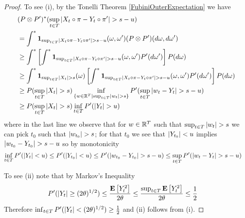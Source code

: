 \begin{proof}
To see (i), by the Tonelli Theorem \ref{FubiniOuterExpectation} we have
\begin{align*}
&(P \otimes P^\prime)^* (\sup_{t \in T} \left \vert X_t \circ \pi  - Y_t \circ \pi^\prime \right \vert > s - u) \\
&=\int^* \textbf{1}_{\sup_{t \in T} \left \vert X_t \circ \pi  - Y_t \circ \pi^\prime \right \vert > s - u}(\omega, \omega^\prime) (P \otimes P^\prime)(d\omega, d\omega^\prime) \\
&\geq \int^* \left [ \int^* \textbf{1}_{\sup_{t \in T} \left \vert X_t \circ \pi  - Y_t \circ \pi^\prime \right \vert > s - u}(\omega, \omega^\prime) P^\prime(d\omega^\prime) \right ] P(d\omega)\\
&\geq \int^* \textbf{1}_{\sup_{t \in T} \left \vert X_t \right \vert > s}(\omega) \left [ \int^* \textbf{1}_{\sup_{t \in T} \left \vert X_t \circ \pi  - Y_t \circ \pi^\prime \right \vert > s - u}(\omega, \omega^\prime) P^\prime(d\omega^\prime) \right ] P(d\omega)\\
&\geq P(\sup_{t \in T} \left \vert X_t \right \vert > s)  \inf_{\lbrace w \in \mathbb{R}^T \mid \sup_{t \in T} \left \vert w_t \right \vert > s \rbrace} P^\prime (\sup_{t \in T} \left \vert w_t  - Y_t \right \vert > s - u)\\
&\geq P(\sup_{t \in T} \left \vert X_t \right \vert > s) \inf_{t \in T} P^\prime(\left \vert Y_t \right \vert > u) \\
\end{align*}
where in the last line we observe that for $w \in \mathbb{R}^T$ such that $\sup_{t \in T} \left \vert w_t \right \vert > s$ we can pick $t_0$ such that $\left \vert w_{t_0} \right \vert > s$; for that $t_0$ we see that $\left \vert Y_{t_0} \right \vert < u$ implies $\left \vert w_{t_0} - Y_{t_0} \right \vert > s - u$ so by monotonicity 
\begin{align*}
\inf_{t \in T} P^\prime ( \left \vert Y_t \right \vert < u) &\leq P^\prime ( \left \vert Y_{t_0} \right \vert < u) \leq P^\prime(\left \vert w_{t_0} - Y_{t_0} \right \vert > s - u) \leq \sup_{t \in T} P^\prime(\left \vert w_t - Y_t \right \vert > s - u)
\end{align*}

To see (ii) note that by Markov's Inequality
\begin{align*}
P^\prime(\left \vert Y_t \right \vert \geq (2\theta)^{1/2}) &\leq \frac{\textbf{E}\left[Y_t^2\right]}{2\theta} \leq \frac{\sup_{t \in T} \textbf{E}\left[Y_t^2\right]}{2\theta} \leq \frac{1}{2}
\end{align*}
Therefore $\inf_{t \in T} P^\prime(\left \vert Y_t \right \vert < (2\theta)^{1/2}) \geq \frac{1}{2}$ and (ii) follows from (i).
\end{proof}

